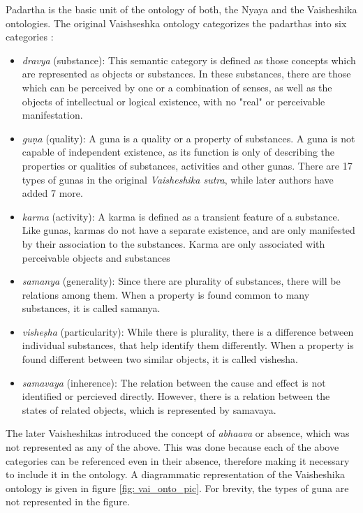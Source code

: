 \documentclass[final, 12pt]{elsarticle}
\begin{document}
Padartha is the basic unit of the ontology of both, the Nyaya and the Vaisheshika ontologies. The original Vaishseshka ontology categorizes the padarthas into six categories \citep{matilal1977nyaya}: 
\begin{itemize}
    \item \emph{dravya} (substance): This semantic category is defined as those concepts which are represented as objects or substances. In these substances, there are those which can be perceived by one or a combination of senses, as well as the objects of intellectual or logical existence, with no "real" or perceivable manifestation.
    
    \item \emph{guṇa} (quality): A guna is a quality or a property of substances. A guna is not capable of independent existence, as its function is only of describing the properties or qualities of substances, activities and other gunas. There are 17 types of gunas in the original \emph{Vaisheshika sutra}, while later authors have added 7 more. 
    
\item \emph{karma} (activity): A karma is defined as a transient feature of a substance. Like gunas, karmas do not have a separate existence, and are only manifested by their association to the substances. Karma are only associated with perceivable objects and substances
    
    \item \emph{samanya} (generality): Since there are plurality of substances, there will be relations among them. When a property is found common to many substances, it is called samanya.
    
    \item \emph{visheṣha} (particularity): While there is plurality, there is a difference between individual substances, that help identify them differently. When a property is found different between two similar objects, it is called vishesha.
    
    \item \emph{samavaya} (inherence): The relation between the cause and effect is not identified or percieved directly. However, there is a relation between the states of related objects, which is represented by samavaya. 
\end{itemize}

The later Vaisheshikas introduced the concept of \emph{abhaava} or absence, which was not represented as any of the above. This was done because each of the above categories can be referenced even in their absence, therefore making it necessary to include it in the ontology. A diagrammatic representation of the Vaisheshika ontology is given in figure \ref{fig: vai_onto_pic}. For brevity, the types of guna are not represented in the figure.
\end{document}
